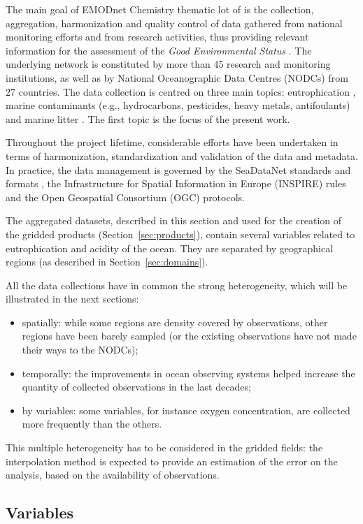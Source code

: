 \documentclass[essd,manuscript]{copernicus}
\begin{document}
The main goal of EMODnet  Chemistry thematic lot of is the collection, aggregation, harmonization and quality control of data gathered from national monitoring efforts and from research activities, thus providing relevant information for the assessment of the \textit{Good Environmental Status} \citep[GES,][]{Vinci2017}. The underlying network is constituted by more than 45 research and monitoring institutions, as well as by National Oceanographic Data Centres (NODCs) from 27 countries. The data collection is centred on three main topics: eutrophication \citep{Giorgetti2020}, marine contaminants (e.g., hydrocarbons, pesticides, heavy metals, antifoulants) and marine litter \citep{Vinci2018}. The first topic is the focus of the present work.

Throughout the project lifetime, considerable efforts have been undertaken in terms of harmonization, standardization and validation of the data and metadata. In practice, the data management is governed by the SeaDataNet standards and formats \citep{Schaap2010}, the Infrastructure for Spatial Information in Europe (INSPIRE) rules and the Open Geospatial Consortium (OGC) protocols. 

The aggregated datasets, described in this section and used for the creation of the gridded products (Section~\ref{sec:products}), contain several variables related to eutrophication and acidity of the ocean. They are separated by geographical regions (as described in Section~\ref{sec:domains}).

All the data collections have in common the strong heterogeneity, which will be illustrated in the next sections: 
\begin{itemize}
\item spatially: while some regions are density covered by observations, other regions have been barely sampled (or the existing observations have not made their ways to the NODCs);
\item temporally: the improvements in ocean observing systems helped increase the quantity of collected observations in the last decades;
\item by variables: some variables, for instance oxygen concentration, are collected more frequently than the others.
\end{itemize}
This multiple heterogeneity has to be considered in the gridded fields: the interpolation method is expected to provide an estimation of the error on the analysis, based on the availability of observations. 


\subsection{Variables\label{sec:variables}}
\end{document}
